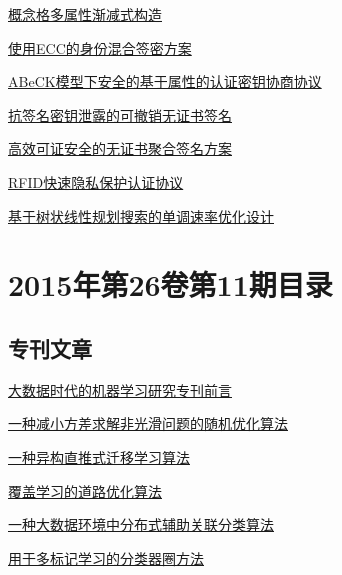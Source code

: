 \documentclass[a4paper]{article}
\begin{document}
\href{http://www.jos.org.cn/ch/reader/download_pdf.aspx?file_no=4818&year_id=2015&quarter_id=12&falg=1}{概念格多属性渐减式构造}

\href{http://www.jos.org.cn/ch/reader/download_pdf.aspx?file_no=4819&year_id=2015&quarter_id=12&falg=1}{使用ECC的身份混合签密方案}

\href{http://www.jos.org.cn/ch/reader/download_pdf.aspx?file_no=4825&year_id=2015&quarter_id=12&falg=1}{ABeCK模型下安全的基于属性的认证密钥协商协议}

\href{http://www.jos.org.cn/ch/reader/download_pdf.aspx?file_no=4826&year_id=2015&quarter_id=12&falg=1}{抗签名密钥泄露的可撤销无证书签名}

\href{http://www.jos.org.cn/ch/reader/download_pdf.aspx?file_no=4830&year_id=2015&quarter_id=12&falg=1}{高效可证安全的无证书聚合签名方案}

\href{http://www.jos.org.cn/ch/reader/download_pdf.aspx?file_no=4832&year_id=2015&quarter_id=12&falg=1}{RFID快速隐私保护认证协议}

\href{http://www.jos.org.cn/ch/reader/download_pdf.aspx?file_no=4853&year_id=2015&quarter_id=12&falg=1}{基于树状线性规划搜索的单调速率优化设计}


\section{\textbf{2015年第26卷第11期目录}}
\subsection{专刊文章}
\href{http://www.jos.org.cn/ch/reader/download_pdf.aspx?file_no=4909&year_id=2015&quarter_id=11&falg=1}{大数据时代的机器学习研究专刊前言}

\href{http://www.jos.org.cn/ch/reader/download_pdf.aspx?file_no=4890&year_id=2015&quarter_id=11&falg=1}{一种减小方差求解非光滑问题的随机优化算法}

\href{http://www.jos.org.cn/ch/reader/download_pdf.aspx?file_no=4892&year_id=2015&quarter_id=11&falg=1}{一种异构直推式迁移学习算法}

\href{http://www.jos.org.cn/ch/reader/download_pdf.aspx?file_no=4901&year_id=2015&quarter_id=11&falg=1}{覆盖学习的道路优化算法}

\href{http://www.jos.org.cn/ch/reader/download_pdf.aspx?file_no=4897&year_id=2015&quarter_id=11&falg=1}{一种大数据环境中分布式辅助关联分类算法}

\href{http://www.jos.org.cn/ch/reader/download_pdf.aspx?file_no=4908&year_id=2015&quarter_id=11&falg=1}{用于多标记学习的分类器圈方法}
\end{document}
